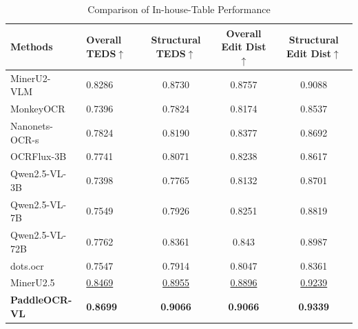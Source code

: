 \documentclass[11pt, a4paper,logo,  copyright, nonumbering]{paddleocr}
\begin{document}
\begin{table}[H]
    \centering
\fontsize{7}{7}\selectfont
   
      \renewcommand{\arraystretch}{1.2}
    \begin{tabular}{@{}l| l *{3}{c} @{}} %
        \toprule
        \textbf{Methods} & \textbf{Overall TEDS$\uparrow$} & \textbf{Structural TEDS$\uparrow$} & \textbf{Overall Edit Dist$\uparrow$} & \textbf{Structural Edit Dist$\uparrow$}\\
        \midrule
        MinerU2-VLM~\cite{MinerU2} & 0.8286 & 0.8730 & 0.8757 & 0.9088 \\
        MonkeyOCR~\cite{li2025monkeyocr} & 0.7396 & 0.7824 & 0.8174 & 0.8537 \\
        Nanonets-OCR-s~\cite{Nanonets-OCR-S} & 0.7824 & 0.8190 & 0.8377 & 0.8692 \\
        OCRFlux-3B~\cite{OCRFlux2025} & 0.7741 & 0.8071 & 0.8238 & 0.8617 \\
        Qwen2.5-VL-3B~\cite{bai2025qwen2} & 0.7398 & 0.7765 & 0.8132 & 0.8701 \\
        Qwen2.5-VL-7B~\cite{bai2025qwen2} & 0.7549 & 0.7926 & 0.8251 & 0.8819 \\
        Qwen2.5-VL-72B~\cite{bai2025qwen2} & 0.7762 & 0.8361 & 0.843 & 0.8987 \\
        dots.ocr~\cite{dotsocr} & 0.7547 & 0.7914 & 0.8047 & 0.8361 \\
        MinerU2.5~\cite{niu2025mineru2} & \cellcolor{cyan!15}\underline{0.8469} & \cellcolor{cyan!15}\underline{0.8955} & \cellcolor{cyan!15}\underline{0.8896} & \cellcolor{cyan!15}\underline{0.9239} \\
        \textbf{PaddleOCR-VL} & \cellcolor{red!15}\textbf {0.8699} & \cellcolor{red!15}\textbf {0.9066} & \cellcolor{red!15}\textbf {0.9066} & \cellcolor{red!15}\textbf{0.9339} \\

        \bottomrule
    \end{tabular}
        \caption{Comparison of In-house-Table Performance}
         \label{tab:performance_0801_refined}
\end{table}
\end{document}
